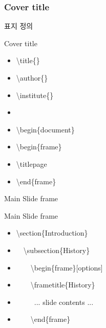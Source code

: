 \documentclass[9pt,blue,xcolor=pdftex,dvipsnames,table,handout,notes]{beamer}
\begin{document}

		\begin{frame}[t]
		\frametitle{Cover title}
			표지 정의

			\begin{block}{Cover title}
			\begin{itemize}
			\item[] \textbackslash title\{\} 
			\item[] \textbackslash author\{\} 
			\item[] \textbackslash institute\{\} 
			\item[] 
			\item[] \textbackslash begin\{document\}
			\item[] \textbackslash begin\{frame\}
			\item[] \textbackslash titlepage
			\item[] \textbackslash end\{frame\}
			\end{itemize}
			\end{block}


		\end{frame}




		\begin{frame}[t]{Main Slide frame}

		\vspace{-\baselineskip}
				\begin{block}{Main Slide frame}
			\begin{itemize}
			\item[] \textbackslash section\{Introduction\} 
			\item[] ~~\textbackslash subsection\{History\} 
			\item[] ~~~~\textbackslash begin\{frame\}[options] 
			\item[] ~~~~\textbackslash frametitle\{History\} 
			\item[] ~~~~~... slide contents ... 
			\item[] ~~~~\textbackslash end\{frame\} 
			\end{itemize}
			\end{block}



		\end{frame}
\end{document}
